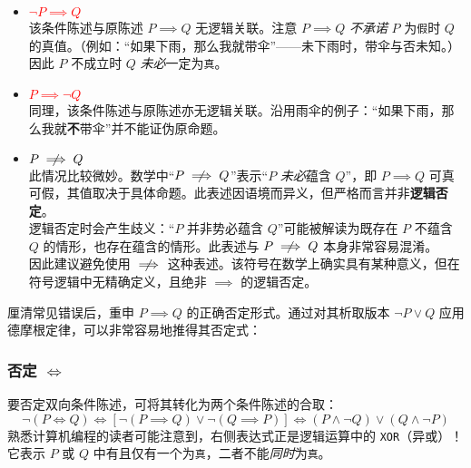 \begin{itemize}
    \item \textcolor{red}{$\neg P \implies Q$} \\
        该条件陈述与原陈述 $P \implies Q$ 无逻辑关联。注意 $P \implies Q$ \emph{不承诺} $P$ 为\verb|假|时 $Q$ 的真值。（例如：``如果下雨，那么我就带伞''——未下雨时，带伞与否未知。）因此 $P$ 不成立时 $Q$ \emph{未必}一定为\verb|真|。

    \item \textcolor{red}{$P \implies \neg Q$} \\
        同理，该条件陈述与原陈述亦无逻辑关联。沿用雨伞的例子：``如果下雨，那么我就\textbf{不}带伞''并不能证伪原命题。

    \item \textcolor{red}{$P \notimplies Q$} \\
        此情况比较微妙。数学中``$P \notimplies Q$''表示``$P$ \emph{未必}蕴含 $Q$''，即 $P \implies Q$ 可真可假，其值取决于具体命题。此表述因语境而异义，但严格而言并非\textbf{逻辑否定}。\\
        \newline
        逻辑否定时会产生歧义：``$P$ 并非势必蕴含 $Q$''可能被解读为既存在 $P$ 不蕴含 $Q$ 的情形，也存在蕴含的情形。此表述与 $P \notimplies Q$ 本身非常容易混淆。\\
        \newline
        因此建议避免使用 $\notimplies$ 这种表述。该符号在数学上确实具有某种意义，但在符号逻辑中无精确定义，且绝非 $\implies$ 的逻辑否定。
\end{itemize}

厘清常见错误后，重申 $P \implies Q$ 的正确否定形式。通过对其析取版本 $\neg P \lor Q$ 应用德摩根定律，可以非常容易地推得其否定式：

\setlength{\fboxrule}{2pt}
\begin{center}
\end{center}

\subsubsection*{否定 $\iff$}

要否定双向条件陈述，可将其转化为两个条件陈述的合取：
\[\neg (P \iff Q) \iff [\neg (P \implies Q) \lor \neg (Q \implies P)] \iff (P \land \neg Q) \lor (Q \land \neg P)\]
熟悉计算机编程的读者可能注意到，右侧表达式正是逻辑运算中的 \verb|XOR|（异或）！它表示 $P$ 或 $Q$ 中有且仅有一个为\verb|真|，二者不能\emph{同时}为\verb|真|。
